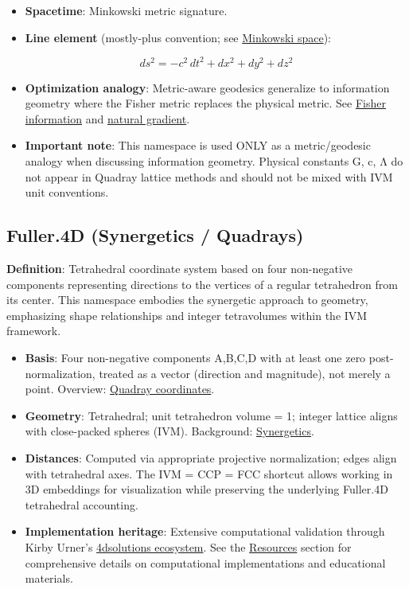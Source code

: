 \documentclass[
  10pt,
]{article}
\providecommand{\tightlist}{%
  \setlength{\itemsep}{0pt}\setlength{\parskip}{0pt}}
\begin{document}
\begin{itemize}
\item
  \textbf{Spacetime}: Minkowski metric signature.
\item
  \textbf{Line element} (mostly-plus convention; see
  \href{https://en.wikipedia.org/wiki/Minkowski_space}{Minkowski
  space}):

  \begin{equation}\label{eq:einstein_line_element}
  ds^2 = -c^2\,dt^2 + dx^2 + dy^2 + dz^2
  \end{equation}
\item
  \textbf{Optimization analogy}: Metric-aware geodesics generalize to
  information geometry where the Fisher metric replaces the physical
  metric. See
  \href{https://en.wikipedia.org/wiki/Fisher_information}{Fisher
  information} and
  \href{https://en.wikipedia.org/wiki/Natural_gradient}{natural
  gradient}.
\item
  \textbf{Important note}: This namespace is used ONLY as a
  metric/geodesic analogy when discussing information geometry. Physical
  constants G, c, Λ do not appear in Quadray lattice methods and should
  not be mixed with IVM unit conventions.
\end{itemize}

\hypertarget{fuller.4d-synergetics-quadrays}{%
\subsection{Fuller.4D (Synergetics /
Quadrays)}\label{fuller.4d-synergetics-quadrays}}

\textbf{Definition}: Tetrahedral coordinate system based on four
non-negative components representing directions to the vertices of a
regular tetrahedron from its center. This namespace embodies the
synergetic approach to geometry, emphasizing shape relationships and
integer tetravolumes within the IVM framework.

\begin{itemize}
\tightlist
\item
  \textbf{Basis}: Four non-negative components A,B,C,D with at least one
  zero post-normalization, treated as a vector (direction and
  magnitude), not merely a point. Overview:
  \href{https://en.wikipedia.org/wiki/Quadray_coordinates}{Quadray
  coordinates}.
\item
  \textbf{Geometry}: Tetrahedral; unit tetrahedron volume = 1; integer
  lattice aligns with close-packed spheres (IVM). Background:
  \href{https://en.wikipedia.org/wiki/Synergetics_(Fuller)}{Synergetics}.
\item
  \textbf{Distances}: Computed via appropriate projective normalization;
  edges align with tetrahedral axes. The IVM = CCP = FCC shortcut allows
  working in 3D embeddings for visualization while preserving the
  underlying Fuller.4D tetrahedral accounting.
\item
  \textbf{Implementation heritage}: Extensive computational validation
  through Kirby Urner's
  \href{https://github.com/4dsolutions}{4dsolutions ecosystem}. See the
  \href{07_resources.md}{Resources} section for comprehensive details on
  computational implementations and educational materials.
\end{itemize}
\end{document}
